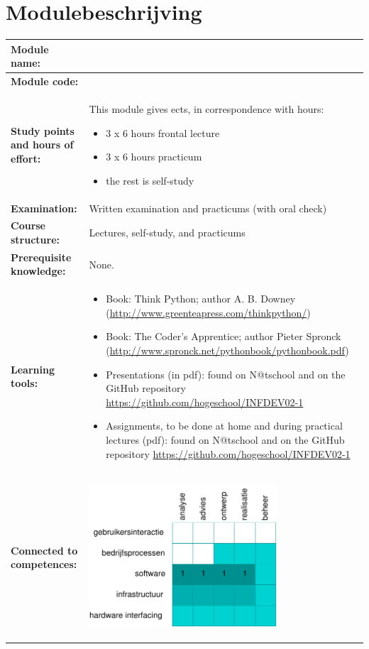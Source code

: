 \section*{Modulebeschrijving}
\begin{tabularx}{\textwidth}{|>{\columncolor{lichtGrijs}} p{}|X|}
	\hline
	\textbf{Module name:} & \modulenaam\\
	\hline
	\textbf{Module code: }& \modulecode\\
	\hline
	\textbf{Study points \newline and hours of effort:} & This module gives \stdPunten{}  ects, in correspondence with \FPeval{\result}{clip(\stdPunten*28)}\result{} hours:
	\begin{itemize}
		\item 3 x 6 hours frontal lecture
		\item 3 x 6 hours practicum
		\item the rest is self-study
	\end{itemize} \\
	\hline
	\textbf{Examination:} & Written examination and practicums (with oral check) \\
	\hline
	\textbf{Course structure:} & Lectures, self-study, and practicums \\
	\hline
	\textbf{Prerequisite knowledge:} & None. \\
	\hline
	\textbf{Learning tools:}  &
		\begin{itemize}
			\item Book: Think Python; author A. B. Downey (\url{http://www.greenteapress.com/thinkpython/})
			\item Book: The Coder’s Apprentice; author Pieter Spronck (\url{http://www.spronck.net/pythonbook/pythonbook.pdf})
			\item Presentations (in pdf): found on N@tschool and on the GitHub repository \url{https://github.com/hogeschool/INFDEV02-1}
			\item Assignments, to be done at home and during practical lectures (pdf): found on N@tschool and on the GitHub repository \url{https://github.com/hogeschool/INFDEV02-1}
		\end{itemize} \\
	\hline
	\textbf{Connected to \newline competences:} &
	\begin{center}
		\includegraphics[width=7cm]{../img/comptabel.pdf}

\end{center}
\end{tabularx}

